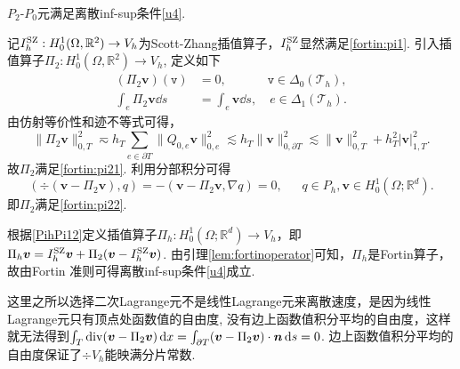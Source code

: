 \begin{lemma}
$P_2$-$P_0$元满足离散inf-sup条件\eqref{u4}.
\end{lemma}
\begin{prf}
记$I_h^{\rm SZ}: H_{0}^{1}(\Omega,\mathbb{R}^{2})\to V_{h}$为Scott-Zhang插值算子\cite{ScottZhang1990}，$I_h^{\rm SZ}$显然满足\eqref{fortin:pi1}.
引入插值算子$\Pi_2: H_{0}^{1}(\Omega,\mathbb{R}^{2})\to V_{h}$, 定义如下
\begin{align*}
(\Pi_2\boldsymbol{v})(\texttt{v})&=0, \quad\quad\quad\;\texttt{v}\in\Delta_0(\mathcal T_h), \\
\int_{e}\Pi_2\boldsymbol{v}\dd s&=\int_{e}\boldsymbol{v}\dd s, \quad e\in\Delta_1(\mathcal T_h).
\end{align*}
由仿射等价性和迹不等式可得，
\begin{equation*}
\|\Pi_{2}\boldsymbol{v}\|_{0,T}^{2}
\eqsim  h_{T}\sum_{e\in\partial T}\|Q_{0,e}\boldsymbol{v}\|_{0,e}^{2}\lesssim h_{T}\|\boldsymbol{v}\|_{0,\partial T}^{2}\lesssim \|\boldsymbol{v}\|_{0,T}^{2}+h_T^2|\boldsymbol{v}|_{1,T}^{2}.
\end{equation*}
故$\Pi_2$满足\eqref{fortin:pi21}.
利用分部积分可得
\begin{equation*}
(\div(\boldsymbol{v}-\Pi_2\boldsymbol{v}),q)=-(\boldsymbol{v}-\Pi_2\boldsymbol{v},\nabla q)=0,
\quad\;\; q\in P_{h}, \boldsymbol{v}\in H_0^{1}(\Omega; \mathbb{R}^{d}).
\end{equation*}
即$\Pi_2$满足\eqref{fortin:pi22}.

根据\eqref{PihPi12}定义插值算子$\Pi_{h}: H_0^{1}(\Omega; \mathbb{R}^{d})\rightarrow  V_{h}$，即
$\Pi_{h}\boldsymbol{v}=I_h^{\rm SZ}\boldsymbol{v}
+\Pi_{2}(\boldsymbol{v}-I_h^{\rm SZ}\boldsymbol{v})$. 由引理\ref{lem:fortinoperator}可知，$\Pi_{h}$是Fortin算子，故由Fortin 准则可得离散inf-sup条件\eqref{u4}成立.
\end{prf}

\begin{remark}
这里之所以选择二次Lagrange元不是线性Lagrange元来离散速度，是因为线性Lagrange元只有顶点处函数值的自由度, 没有边上函数值积分平均的自由度，这样就无法得到$\int_{T} \operatorname{div}(\boldsymbol{v}-\Pi_2\boldsymbol{v})\,{\rm d}x
= \int_{\partial T}(\boldsymbol{v}-\Pi_2\boldsymbol{v})\cdot\boldsymbol{n}\,{\rm d} s
=0$. 边上函数值积分平均的自由度保证了$\div V_h$能映满分片常数.
\end{remark}

